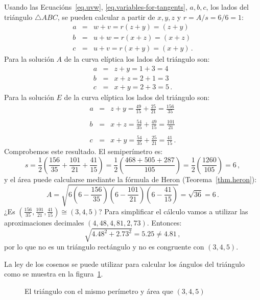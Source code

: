 Usando las Ecuacións~\ref{eq.uvw}, \ref{eq.variables-for-tangents}, $a,b,c$, los lados del triángulo $\triangle ABC$, se pueden calcular a partir de $x,y,z$ y $r=A/s=6/6=1$:
\begin{eqnarray*}
a&=&w+v = r(z+y)=(z+y)\\
b&=&u+w= r(x+z)=(x+z)\\
c&=&u+v=r(x+y)=(x+y)\,.
\end{eqnarray*}
Para la solución $A$ de la curva elíptica los lados del triángulo son:
\begin{eqnarray*}
a &=& z+y = 1+3 = 4\\
b &=& x+z = 2+1=3\\
c &=& x+y = 2+3=5\,.
\end{eqnarray*}
Para la solución $E$ de la curva elíptica los lados del triángulo son:
\begin{eqnarray*}
a &=& z+y = \frac{49}{15} + \frac{25}{21} = \frac{156}{35}\\
&&\\
b &=& x+z = \frac{54}{35} + \frac{49}{15} = \frac{101}{21}\\
&&\\
c &=& x+y = \frac{54}{35} + \frac{25}{21} =\frac{41}{15}\,.
\end{eqnarray*}
Comprobemos este resultado. El semiperímetro es:
\[
s=\frac{1}{2}\left(\frac{156}{35} + \frac{101}{21}+\frac{41}{15}\right) = \frac{1}{2}\left(\frac{468+505+287}{105}\right) = \frac{1}{2}\left(\frac{1260}{105}\right)= 6\,,
\]
y el área puede calcularse mediante la fórmula de Heron (Teorema~\ref{thm.heron}):
\[
A= \sqrt{6 \left(6-\frac{156}{35}\right) \left(6-\frac{101}{21}\right) \left(6-\frac{41}{15}\right)}=\sqrt{36} = 6\,.
\]
¿Es $\left(\frac{156}{35}, \frac{101}{21}, \frac{41}{15}\right)\cong(3,4,5)$? Para simplificar el cálculo vamos a utilizar las aproximaciones decimales $(4,48,4,81,2,73)$. Entonces:
\[
\sqrt{4.48^2+2.73^2}=5.25\neq 4.81\,,
\]
por lo que no es un triángulo rectángulo y no es congruente con $(3,4,5)$.

La ley de los cosenos se puede utilizar para calcular los ángulos del triángulo como se muestra en la figura~\ref{f.not-a-right-triangle}.


\begin{figure}[t]
\begin{center}
\end{center}
\caption{El triángulo con el mismo perímetro y área que $(3,4,5)$}\label{f.not-a-right-triangle}
\end{figure}

